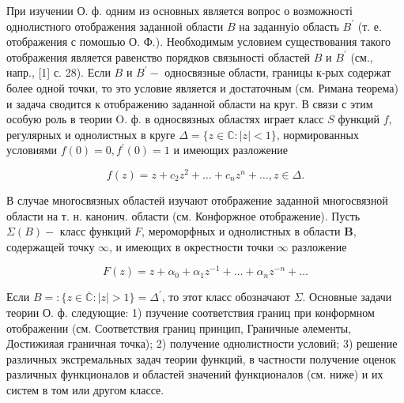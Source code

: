 \documentclass[10pt]{article}
\begin{document}
При изучении О. ф. одним из основных является вопрос о возможності однолистного отображения заданной области $B$ на заданнуіо область $B^{\prime}$ (т. е. отображения с помошью О. Ф.). Необходимым условием существования такого отображения является равенство порядков связыності областей $B$ и $B^{\prime}$ (см., напр., [1] с. 28). Если $B$ и $B^{\prime}-$ односвязные области, границы к-рых содержат более одной точки, то это условие является и достаточным (см. Римана теорема) и задача сводится к отображению заданной области на круг. В связи с этим особую роль в теории O. ф. в односвязных областях играет класс $S$ функций $f$, регулярных и однолистных в круге $\Delta=\{z \in \mathbb{C}:|z|<1\}$, нормированных условиями $f(0)=0, f^{\prime}(0)=1$ и имеющих разложение



\[

f(z)=z+c_{2} z^{2}+\ldots+c_{n} z^{n}+\ldots, z \in \Delta .

\]



В случае многосвязных областей изучают отображение заданной многосвязной области на т. н. канонич. области (см. Конфоржное отображение). Пусть $\Sigma(B)-$ класс функций $F$, мероморфных и однолистных в области $\boldsymbol{B}$, содержащей точку $\infty$, и имеющих в окрестности точки $\infty$ разложение



\[

F(z)=z+\alpha_{0}+\alpha_{1} z^{-1}+\ldots+\alpha_{n} z^{-n}+\ldots

\]



Если $B=:\{z \in \overline{\mathbb{C}}:|z|>1\}=\Delta^{\prime}$, то этот класс обозначают $\Sigma$. Основные задачи теории О. ф. следующие: 1) пзучение соответствия границ при конформном отображении (см. Соответствия границ принцип, Граничные әлементы, Достижияая граничная точка); 2) получение однолистности условий; 3) решение различных экстремальных задач теории функций, в частности получение оценок различных функционалов и областей значений функционалов (см. ниже) и их систем в том или другом классе.
\end{document}
